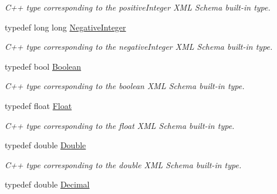 \begin{DoxyCompactItemize}
\begin{DoxyCompactList}\small\item\em C++ type corresponding to the positiveInteger XML Schema built-\/in type. \item\end{DoxyCompactList}\item 
\hypertarget{namespacexml__schema_a259733f00b5273e1f2988b40be1b9f60}{
typedef long long \hyperlink{namespacexml__schema_a259733f00b5273e1f2988b40be1b9f60}{NegativeInteger}}
\label{namespacexml__schema_a259733f00b5273e1f2988b40be1b9f60}

\begin{DoxyCompactList}\small\item\em C++ type corresponding to the negativeInteger XML Schema built-\/in type. \item\end{DoxyCompactList}\item 
\hypertarget{namespacexml__schema_a2749f4f861e3517d559bb221b03e6b5b}{
typedef bool \hyperlink{namespacexml__schema_a2749f4f861e3517d559bb221b03e6b5b}{Boolean}}
\label{namespacexml__schema_a2749f4f861e3517d559bb221b03e6b5b}

\begin{DoxyCompactList}\small\item\em C++ type corresponding to the boolean XML Schema built-\/in type. \item\end{DoxyCompactList}\item 
\hypertarget{namespacexml__schema_a5e78682cd0ca4557bf22c75ec8266c6a}{
typedef float \hyperlink{namespacexml__schema_a5e78682cd0ca4557bf22c75ec8266c6a}{Float}}
\label{namespacexml__schema_a5e78682cd0ca4557bf22c75ec8266c6a}

\begin{DoxyCompactList}\small\item\em C++ type corresponding to the float XML Schema built-\/in type. \item\end{DoxyCompactList}\item 
\hypertarget{namespacexml__schema_ad4d9be8ec9a5415e9522df5aaa17f791}{
typedef double \hyperlink{namespacexml__schema_ad4d9be8ec9a5415e9522df5aaa17f791}{Double}}
\label{namespacexml__schema_ad4d9be8ec9a5415e9522df5aaa17f791}

\begin{DoxyCompactList}\small\item\em C++ type corresponding to the double XML Schema built-\/in type. \item\end{DoxyCompactList}\item 
\hypertarget{namespacexml__schema_a9ec4af2c5785716c4ecf9e1826163098}{
typedef double \hyperlink{namespacexml__schema_a9ec4af2c5785716c4ecf9e1826163098}{Decimal}}
\label{namespacexml__schema_a9ec4af2c5785716c4ecf9e1826163098}


\end{DoxyCompactItemize}
